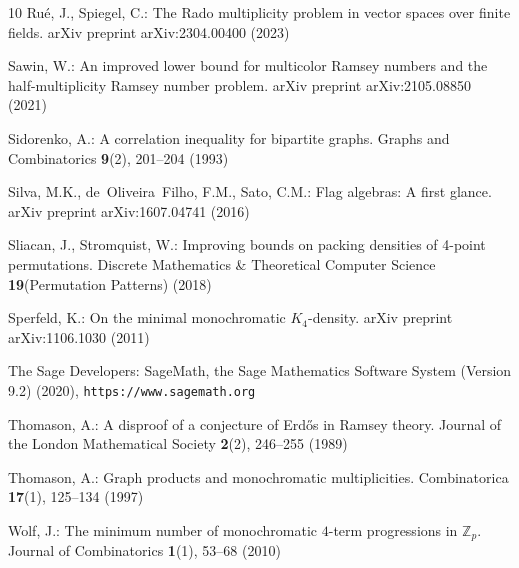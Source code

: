 \documentclass[a4paper,11pt]{article}
\numberwithin{equation}{section}
\begin{document}
\begin{thebibliography}{10}
Ru{\'e}, J., Spiegel, C.: The Rado multiplicity problem in vector spaces over
  finite fields. arXiv preprint arXiv:2304.00400  (2023)

Sawin, W.: An improved lower bound for multicolor {R}amsey numbers and the
  half-multiplicity {R}amsey number problem. arXiv preprint arXiv:2105.08850
  (2021)

Sidorenko, A.: A correlation inequality for bipartite graphs. Graphs and
  Combinatorics  \textbf{9}(2),  201--204 (1993)

Silva, M.K., de~Oliveira~Filho, F.M., Sato, C.M.: Flag algebras: A first
  glance. arXiv preprint arXiv:1607.04741  (2016)

Sliacan, J., Stromquist, W.: Improving bounds on packing densities of 4-point
  permutations. Discrete Mathematics \& Theoretical Computer Science
  \textbf{19}(Permutation Patterns) (2018)

Sperfeld, K.: On the minimal monochromatic {$K_4$}-density. arXiv preprint
  arXiv:1106.1030  (2011)

{The Sage Developers}: {S}ageMath, the {S}age {M}athematics {S}oftware {S}ystem
  ({V}ersion 9.2) (2020), {\tt https://www.sagemath.org}

Thomason, A.: A disproof of a conjecture of {E}rd{\H{o}}s in {R}amsey theory.
  Journal of the London Mathematical Society  \textbf{2}(2),  246--255 (1989)

Thomason, A.: Graph products and monochromatic multiplicities. Combinatorica
  \textbf{17}(1),  125--134 (1997)

Wolf, J.: The minimum number of monochromatic $4$-term progressions in
  $\mathbb{Z}_p$. Journal of Combinatorics  \textbf{1}(1),  53--68 (2010)

\end{thebibliography}
\end{document}

